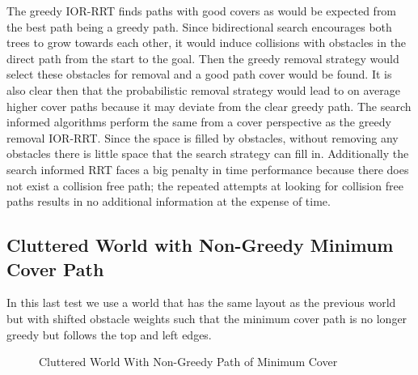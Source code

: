 The greedy IOR-RRT finds paths with good covers as would be expected from the best path being a greedy path. Since bidirectional search encourages both trees to grow towards each other, it would induce collisions with obstacles in the direct path from the start to the goal. Then the greedy removal strategy would select these obstacles for removal and a good path cover would be found. It is also clear then that the probabilistic removal strategy would lead to on average higher cover paths because it may deviate from the clear greedy path. The search informed algorithms perform the same from a cover perspective as the greedy removal IOR-RRT. Since the space is filled by obstacles, without removing any obstacles there is little space that the search strategy can fill in. Additionally the search informed RRT faces a big penalty in time performance because there does not exist a collision free path; the repeated attempts at looking for collision free paths results in no additional information at the expense of time.


\subsection{Cluttered World with Non-Greedy Minimum Cover Path}
In this last test we use a world that has the same layout as the previous world but with shifted obstacle weights such that the minimum cover path is no longer greedy but follows the top and left edges. 


\begin{figure}[!h]
    \hfill
    \caption{Cluttered World With Non-Greedy Path of Minimum Cover}
    \label{fig:top_light_cluttered_world}
\end{figure}


